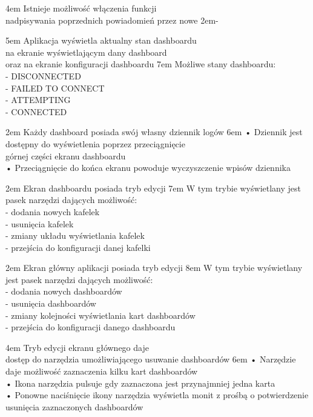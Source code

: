 {4em}{
    Istnieje możliwość włączenia funkcji\\
    nadpisywania poprzednich powiadomień przez nowe
}
{2em}{-}

{5em}{
    Aplikacja wyświetla aktualny stan dashboardu\\
    na ekranie wyświetlającym dany dashboard\\
    oraz na ekranie konfiguracji dashboardu
}
{7em}{
    Możliwe stany dashboardu:\\
    - DISCONNECTED\\
    - FAILED TO CONNECT\\
    - ATTEMPTING\\
    - CONNECTED
}

{2em}{
    Każdy dashboard posiada swój własny dziennik logów
}
{6em}{
    • Dziennik jest dostępny do wyświetlenia poprzez przeciągnięcie\\
    \hspace*{0.5em} górnej części ekranu dashboardu\\

    • Przeciągnięcie do końca ekranu powoduje wyczyszczenie wpisów dziennika
}

{2em}{
    Ekran dashboardu posiada tryb edycji
}
{7em}{
    W tym trybie wyświetlany jest pasek narzędzi dających możliwość:\\
    - dodania nowych kafelek\\
    - usunięcia kafelek\\
    - zmiany układu wyświetlania kafelek\\
    - przejścia do konfiguracji danej kafelki
}

{2em}{
    Ekran główny aplikacji posiada tryb edycji
}
{8em}{
    W tym trybie wyświetlany jest pasek narzędzi dających możliwość:\\
    - dodania nowych dashboardów\\
    - usunięcia dashboardów\\
    - zmiany kolejności wyświetlania kart dashboardów\\
    - przejścia do konfiguracji danego dashboardu
}

{4em}{
    Tryb edycji ekranu głównego daje\\
    dostęp do narzędzia umożliwiającego usuwanie dashboardów
}
{6em}{
    • Narzędzie daje możliwość zaznaczenia kilku kart dashboardów\\
    • Ikona narzędzia pulsuje gdy zaznaczona jest przynajmniej jedna karta\\
    • Ponowne naciśnięcie ikony narzędzia wyświetla monit z prośbą o potwierdzenie\\
    \hspace*{0.5em} usunięcia zaznaczonych dashboardów
}

